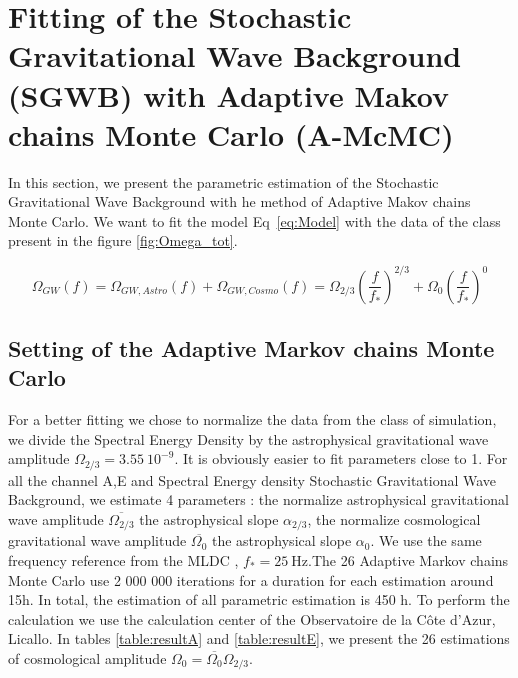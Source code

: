 \documentclass[a4paper,12pt]{article}
\begin{document}
\section{Fitting of the Stochastic Gravitational Wave Background (SGWB) with Adaptive Makov chains Monte Carlo (A-McMC)}

In this section, we present the parametric estimation of the Stochastic Gravitational Wave Background with he method of Adaptive Makov chains Monte Carlo. We want to fit the model Eq~\ref{eq:Model} with the data of the class present in the figure \ref{fig:Omega_tot}.

\begin{equation}
\label{eq:Model}
	\Omega_{GW}(f) = \Omega_{GW,Astro}(f) + \Omega_{GW,Cosmo}(f) = \Omega_{2/3} \left(\frac{f}{f_*}\right)^{2/3} + \Omega_0 \left(\frac{f}{f_*}\right)^0
\end{equation}

\subsection{Setting of the Adaptive Markov chains Monte Carlo}

For a better fitting we chose to normalize the data from the class of simulation, we divide the Spectral Energy Density by the astrophysical gravitational wave amplitude $ \Omega_{2/3} = 3.55 \ 10^{-9}$.  It is obviously easier to fit parameters close to 1. For all the channel A,E and  Spectral Energy density Stochastic Gravitational Wave Background, we estimate 4 parameters : the normalize astrophysical gravitational wave amplitude $\overline{\Omega_{2/3}}$ the astrophysical slope $\alpha_{2/3}$, the normalize cosmological gravitational wave amplitude $\overline{\Omega_{0}}$ the astrophysical slope $\alpha_{0}$. We use the same frequency reference from the MLDC \cite{LDCM}, $f_* = 25 \ \text{Hz}$.The 26 Adaptive Markov chains Monte Carlo use 2 000 000 iterations for a duration for each estimation around 15h. In total, the estimation of all parametric estimation is 450 h. To perform the calculation we use the calculation center of the Observatoire de la Côte d'Azur, Licallo. In tables \ref{table:resultA} and \ref{table:resultE}, we present the 26 estimations of cosmological amplitude $\Omega_0 = \overline{\Omega_0}\Omega_{2/3} $.  
\end{document}
